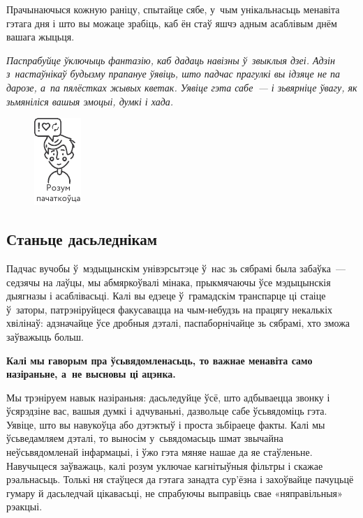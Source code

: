 
Прачынаючыся кожную раніцу, спытайце сябе, у~чым унікальнасьць менавіта гэтага дня і што вы можаце зрабіць, каб ён стаў яшчэ адным асаблівым днём вашага жыцьця.

\emph{Паспрабуйце ўключыць фантазію, каб дадаць навізны ў~звыклыя дзеі. Адзін з~настаўнікаў будызму прапануе ўявіць, што падчас прагулкі вы ідзяце не па дарозе, а~па пялёстках жывых кветак. Уявіце гэта сабе~--- і зьвярніце ўвагу, як зьмяніліся вашыя эмоцыі, думкі і хада.}

\begin{figure}[htb!]
  \centering
  \includegraphics[scale=1.5]{willpower/ch8/11.pdf}
\end{figure}

\subsection*{Станьце дасьледнікам}

Падчас вучобы ў~мэдыцынскім унівэрсытэце ў~нас зь сябрамі была забаўка~--- седзячы на лаўцы, мы абмяркоўвалі мінака, прыкмячаючы ўсе мэдыцынскія дыягназы і асаблівасьці. Калі вы едзеце ў~грамадскім транспарце ці стаіце ў~заторы, патрэніруйцеся факусавацца на чым-небудзь на працягу некалькіх хвілінаў: адзначайце ўсе дробныя дэталі, паспаборнічайце зь сябрамі, хто зможа заўважыць больш.

\textbf{Калі мы гаворым пра ўсьвядомленасьць, то важнае менавіта само назіраньне, а~не высновы ці ацэнка.}

Мы трэніруем навык назіраньня: дасьледуйце ўсё, што адбываецца звонку і ўсярэдзіне вас, вашыя думкі і адчуваньні, дазвольце сабе ўсьвядоміць гэта. Уявіце, што вы навукоўца або дэтэктыў і проста зьбіраеце факты. Калі мы ўсьведамляем дэталі, то выносім у~сьвядомасьць шмат звычайна неўсьвядомленай інфармацыі, і ўжо гэта мяняе нашае да яе стаўленьне. Навучыцеся заўважаць, калі розум уключае кагнітыўныя фільтры і скажае рэальнасьць. Толькі ня стаўцеся да гэтага занадта сур'ёзна і захоўвайце пачуцьцё гумару й дасьледчай цікавасьці, не спрабуючы выправіць свае «няправільныя» рэакцыі.

